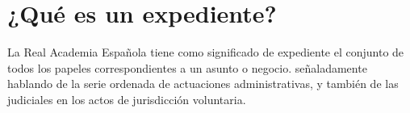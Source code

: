 \section{¿Qué es un expediente?}

La Real Academia Española tiene como significado de expediente el conjunto de todos los papeles correspondientes a un asunto o negocio. señaladamente hablando de la serie ordenada de actuaciones administrativas, y también de las judiciales en los actos de jurisdicción voluntaria.